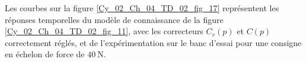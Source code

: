 Les courbes sur la figure \ref{Cy_02_Ch_04_TD_02_fig_17} représentent les réponses temporelles du modèle de connaissance de la figure \ref{Cy_02_Ch_04_TD_02_fig_11}, avec les correcteurs $C_{v}(p)$ et $C(p)$ correctement réglés, et de l'expérimentation sur le banc d'essai pour une consigne en échelon de force de $40 \mathrm{~N}$.


\ifprof
\begin{corrige}
\end{corrige}
\else
\fi

